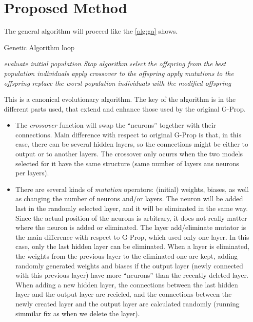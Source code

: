 \documentclass[runningheads]{llncs}
\begin{document}
\section{Proposed Method}
\label{method}

The general algorithm will proceed like the \autoref{alg:ga} shows.

\begin{algorithm}
  \caption{Genetic Algorithm loop}\label{alg:ga}
  \begin{algorithmic}[1]
    \State \textit{evaluate initial population}
    \State \textit{Stop algorithm}
    \EndIf
    \State \textit{select the offspring from the best population individuals}
    \State \textit{apply crossover to the offspring}
    \State \textit{apply mutations to the offspring}
    \State \textit{replace the worst population individuals with the modified offspring}
    \EndWhile
  \end{algorithmic}
\end{algorithm}

This is a canonical evolutionary algorithm. The key of the algorithm is
in the different parts used, that extend and enhance those used by the
original G-Prop. \begin{itemize}

  \item The {\em crossover} function will swap the ``neurons'' together with
    their connections. Main difference with respect to original G-Prop is that,
    in this case, there can be several hidden layers, so the connections might
    be either to output or to another layers. The crossover only ocurrs when
    the two models selected for it have the same structure (same number of
    layers ans neurons per layers).

  \item There are several kinds of {\em mutation} operators: (initial) weights,
    biases, as well as changing the number of neurons and/or
    layers. The neuron will be added last in the randomly selected layer,
    and it will be eliminated in the same way. Since the actual position of the
    neurons is arbitrary, it does not really matter where the neuron
    is added or eliminated. The layer add/eliminate mutator is the
    main difference with respect to G-Prop, which used only one
    layer. In this case, only the last hidden layer can be eliminated. When a
    layer is eliminated, the weights from the previous layer to the eliminated
    one are kept, adding randomly generated weights and biases if the output
    layer (newly connected with this previous layer) have more ``neurons'' than
    the recently deleted layer. When adding a new hidden layer, the connections
    between the last hidden layer and the output layer are recicled, and the
    connections between the newly created layer and the output layer are
    calculated randomly (running simmilar fix as when we delete the layer).
\end{itemize}
\end{document}
